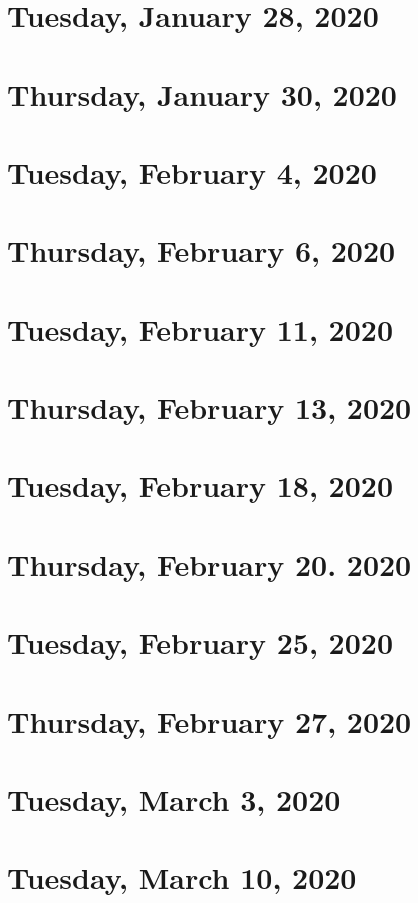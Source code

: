 \documentclass{../mynotes}
\begin{document}
\section{Tuesday, January 28, 2020}
    
\section{Thursday, January 30, 2020}
    

\section{Tuesday, February 4, 2020}
    
\section{Thursday, February 6, 2020}
    
    
\section{Tuesday, February 11, 2020}
    
\section{Thursday, February 13, 2020}
    

\section{Tuesday, February 18, 2020}
    
\section{Thursday, February 20. 2020}
    

\section{Tuesday, February 25, 2020}
    
\section{Thursday, February 27, 2020}
    

\section{Tuesday, March 3, 2020}
    

\section{Tuesday, March 10, 2020}
    

%     
\end{document}
